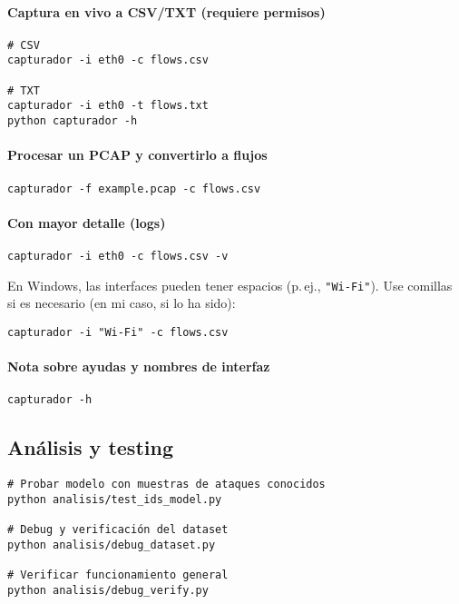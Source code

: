 \paragraph{Captura en vivo a CSV/TXT (requiere permisos)}

\begin{lstlisting}[style=tfgbash,caption={Comandos de captura CLI},label=List.CLICapture]
# CSV
capturador -i eth0 -c flows.csv

# TXT
capturador -i eth0 -t flows.txt
python capturador -h
\end{lstlisting}

\paragraph{Procesar un PCAP y convertirlo a flujos}
\begin{lstlisting}[style=tfgbash,caption={PCAP -> CSV},label=List.PcapCSV]
capturador -f example.pcap -c flows.csv
\end{lstlisting}

\paragraph{Con mayor detalle (logs)}
\begin{lstlisting}[style=tfgbash,caption={Añadir verbosidad},label=List.Verbose]
capturador -i eth0 -c flows.csv -v
\end{lstlisting}

En Windows, las interfaces pueden tener espacios (p.\,ej., \texttt{"Wi-Fi"}). Use comillas si es necesario (en mi caso, si lo ha sido):
\begin{lstlisting}[style=tfgbash,caption={Ejemplo con interfaz con espacios (Windows)},label=List.WinIface]
capturador -i "Wi-Fi" -c flows.csv
\end{lstlisting}

\paragraph{Nota sobre ayudas y nombres de interfaz}
\begin{lstlisting}[style=tfgbash,caption={Ayuda de la CLI},label=List.CLIHelp]
capturador -h
\end{lstlisting}

\subsection*{Análisis y testing}
\begin{lstlisting}[style=tfgbash,caption={Scripts de análisis disponibles},label=List.Analysis]
# Probar modelo con muestras de ataques conocidos
python analisis/test_ids_model.py

# Debug y verificación del dataset
python analisis/debug_dataset.py

# Verificar funcionamiento general
python analisis/debug_verify.py
\end{lstlisting}

